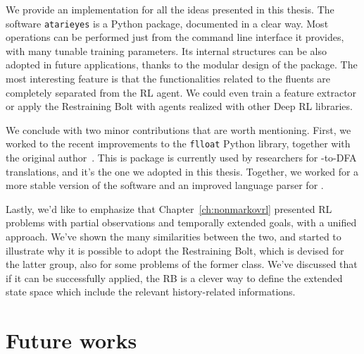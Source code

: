 \begin{description}[style=nextline]
	\item[The \texttt{atarieyes} package]
		We provide an implementation for all the ideas presented in this thesis.
		The software \texttt{atarieyes} is a Python package, documented in a clear
		way.  Most operations can be performed just from the command line
		interface it provides, with many tunable training parameters. Its internal
		structures can be also adopted in future applications, thanks to the
		modular design of the package. The most interesting feature is that the
		functionalities related to the fluents are completely separated from the
		RL agent. We could even train a feature extractor or apply the Restraining
		Bolt with agents realized with other Deep RL libraries.

\end{description}

We conclude with two minor contributions that are worth mentioning. First, we
worked to the recent improvements to the \texttt{flloat} Python library,
together with the original author~\cite{bib:favorito-thesis}. This is package
is currently used by researchers for \ldl{}-to-DFA translations, and it's the
one we adopted in this thesis. Together, we worked for a more stable version
of the software and an improved language parser for \ldl{}.

Lastly, we'd like to emphasize that Chapter~\ref{ch:nonmarkovrl} presented RL
problems with partial observations and temporally extended goals, with a
unified approach. We've shown the many similarities between the two, and
started to illustrate why it is possible to adopt the Restraining Bolt, which
is devised for the latter group, also for some problems of the former class.
We've discussed that if it can be successfully applied, the RB is a clever way
to define the extended state space which include the relevant history-related
informations.


\section{Future works}

\label{sec:future}

